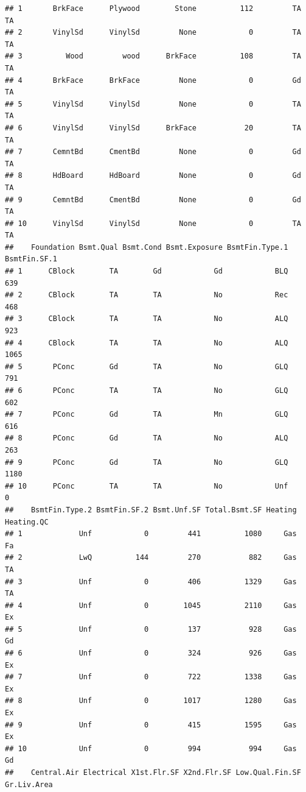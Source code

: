 \documentclass[
]{article}
\begin{document}
\begin{verbatim}
## 1       BrkFace      Plywood        Stone          112         TA         TA
## 2       VinylSd      VinylSd         None            0         TA         TA
## 3          Wood         wood      BrkFace          108         TA         TA
## 4       BrkFace      BrkFace         None            0         Gd         TA
## 5       VinylSd      VinylSd         None            0         TA         TA
## 6       VinylSd      VinylSd      BrkFace           20         TA         TA
## 7       CemntBd      CmentBd         None            0         Gd         TA
## 8       HdBoard      HdBoard         None            0         Gd         TA
## 9       CemntBd      CmentBd         None            0         Gd         TA
## 10      VinylSd      VinylSd         None            0         TA         TA
##    Foundation Bsmt.Qual Bsmt.Cond Bsmt.Exposure BsmtFin.Type.1 BsmtFin.SF.1
## 1      CBlock        TA        Gd            Gd            BLQ          639
## 2      CBlock        TA        TA            No            Rec          468
## 3      CBlock        TA        TA            No            ALQ          923
## 4      CBlock        TA        TA            No            ALQ         1065
## 5       PConc        Gd        TA            No            GLQ          791
## 6       PConc        TA        TA            No            GLQ          602
## 7       PConc        Gd        TA            Mn            GLQ          616
## 8       PConc        Gd        TA            No            ALQ          263
## 9       PConc        Gd        TA            No            GLQ         1180
## 10      PConc        TA        TA            No            Unf            0
##    BsmtFin.Type.2 BsmtFin.SF.2 Bsmt.Unf.SF Total.Bsmt.SF Heating Heating.QC
## 1             Unf            0         441          1080     Gas         Fa
## 2             LwQ          144         270           882     Gas         TA
## 3             Unf            0         406          1329     Gas         TA
## 4             Unf            0        1045          2110     Gas         Ex
## 5             Unf            0         137           928     Gas         Gd
## 6             Unf            0         324           926     Gas         Ex
## 7             Unf            0         722          1338     Gas         Ex
## 8             Unf            0        1017          1280     Gas         Ex
## 9             Unf            0         415          1595     Gas         Ex
## 10            Unf            0         994           994     Gas         Gd
##    Central.Air Electrical X1st.Flr.SF X2nd.Flr.SF Low.Qual.Fin.SF Gr.Liv.Area

\end{verbatim}
\end{document}
